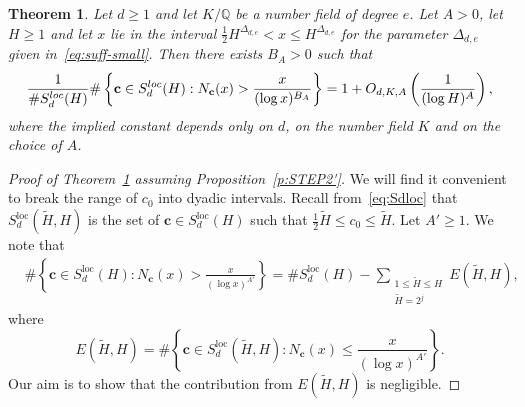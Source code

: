 \documentclass[11pt,letterpaper]{amsart}
\renewcommand{\leq}{\leqslant}
\renewcommand{\geq}{\geqslant}
\newtheorem{theorem}{Theorem}[section]
\theoremstyle{definition}
\numberwithin{equation}{section}
\renewcommand{\c}{\mathbf{c}}
\newcommand{\0}{\mathbf{0}}
\begin{document}
\begin{theorem}\label{t:1'}
Let $d\geq 1$ and 
let  $K/\mathbb{Q}$ be a number field of degree $e$.
Let  $A>0$, let  $H\geq 1$ and let $x$ lie in the interval
$
\frac{1}{2}H^{\Delta_{d,e}}< x\leq H^{\Delta_{d,e}}
$
for the parameter 
$\Delta_{d,e}$ given in~\eqref{eq:suff-small}.
Then there exists $B_A>0$ such that 
$$
\frac{1}{\#S_d^{\textnormal{loc}}(H) }\# \left\{ \c\in S_d^{\textnormal{loc}}(H): 
N_{\c}(x)> \frac{x}{(\log x)^{B_A}}\right\}= 1+O_{d,K,A}\left(\frac{1}{(\log H)^A}\right),
$$
where the implied constant depends only on $d$, on the number field $K$ and on the choice of $A$.
\end{theorem}

\begin{proof}[Proof of Theorem~\ref{t:1'} assuming Proposition~\ref{p:STEP2'}]
We will find it convenient to break the range of $c_0$ into dyadic intervals.
Recall  from~\eqref{eq:Sdloc} that 
 $S_d^{\text{loc}}(\tilde H, H)$ is 
the set of $\c\in S_d^{\text{loc}}(H)$ such that $\frac{1}{2}\tilde H\leq c_0\leq \tilde H$. 
Let $A'\geq 1$. We note that 
\begin{align*}
&\# \left\{ \c\in S_d^{\text{loc}}(H): 
N_{\c}(x)> \frac{x}{(\log x)^{A'}}
\right\} 
=\#S_d^{\text{loc}}(H)-\sum_{\substack{1\leq \tilde H\leq H\\\tilde H=2^j}} E(\tilde H, H),
\end{align*}
where
$$
E(\tilde H, H)=
\# \left\{ \c\in S_d^{\text{loc}}(\tilde H, H): 
N_{\c}(x)\leq  \frac{x}{(\log x)^{A'}}
\right\}.
$$
Our aim is to show that the contribution from $E(\tilde H, H)$ is negligible. 


\end{proof}
\end{document}
